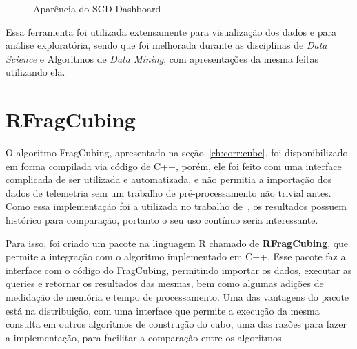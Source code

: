 \begin{figure}[ht]
	\caption{Aparência do SCD-Dashboard}\label{fig:scddashboard}
	\vspace{6mm}
	\begin{center}
	\end{center}
	\vspace{4mm}
	\legenda{}
\end{figure}

Essa ferramenta foi utilizada extensamente para visualização dos dados e para análise exploratória, sendo que foi melhorada durante as disciplinas de \textit{Data Science} e Algoritmos de \textit{Data Mining}, com apresentações da mesma feitas utilizando ela.

\section{RFragCubing}
\label{ch:impl:rfrag}

O algoritmo FragCubing, apresentado na seção~\ref{ch:corr:cube}, foi disponibilizado em forma compilada via código de C++, porém, ele foi feito com uma interface complicada de ser utilizada e automatizada, e não permitia a importação dos dados de telemetria sem um trabalho de pré-processamento não trivial antes.
Como essa implementação foi a utilizada no trabalho de~\cite{silva:2015:abordagensParaCubo}, os resultados possuem histórico para comparação, portanto o seu uso contínuo seria interessante.

Para isso, foi criado um pacote na linguagem R chamado de \textbf{RFragCubing}, que permite a integração com o algoritmo implementado em C++.
Esse pacote faz a interface com o código do FragCubing, permitindo importar os dados, executar as queries e retornar os resultados das mesmas, bem como algumas adições de medidação de memória e tempo de processamento.
Uma das vantagens do pacote está na distribuição, com uma interface que permite a execução da mesma consulta em outros algoritmos de construção do cubo, uma das razões para fazer a implementação, para facilitar a comparação entre os algoritmos.

